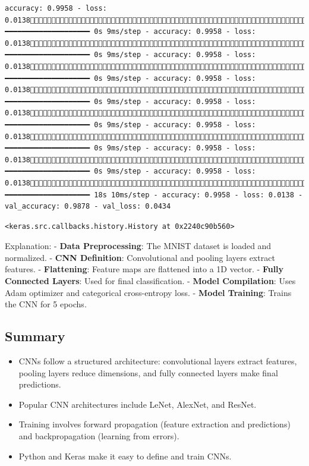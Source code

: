 \documentclass[
  letterpaper,
  DIV=11,
  numbers=noendperiod]{scrreprt}
\providecommand{\tightlist}{%
  \setlength{\itemsep}{0pt}\setlength{\parskip}{0pt}}\usepackage{longtable,booktabs,array}
\begin{document}
\begin{verbatim}
accuracy: 0.9958 - loss: 0.01381832/1875 ━━━━━━━━━━━━━━━━━━━━ 0s 9ms/step - accuracy: 0.9958 - loss: 0.01381838/1875 ━━━━━━━━━━━━━━━━━━━━ 0s 9ms/step - accuracy: 0.9958 - loss: 0.01381844/1875 ━━━━━━━━━━━━━━━━━━━━ 0s 9ms/step - accuracy: 0.9958 - loss: 0.01381850/1875 ━━━━━━━━━━━━━━━━━━━━ 0s 9ms/step - accuracy: 0.9958 - loss: 0.01381857/1875 ━━━━━━━━━━━━━━━━━━━━ 0s 9ms/step - accuracy: 0.9958 - loss: 0.01381864/1875 ━━━━━━━━━━━━━━━━━━━━ 0s 9ms/step - accuracy: 0.9958 - loss: 0.01381871/1875 ━━━━━━━━━━━━━━━━━━━━ 0s 9ms/step - accuracy: 0.9958 - loss: 0.01381875/1875 ━━━━━━━━━━━━━━━━━━━━ 18s 10ms/step - accuracy: 0.9958 - loss: 0.0138 - val_accuracy: 0.9878 - val_loss: 0.0434
\end{verbatim}

\begin{verbatim}
<keras.src.callbacks.history.History at 0x2240c90b560>
\end{verbatim}

Explanation: - \textbf{Data Preprocessing}: The MNIST dataset is loaded
and normalized. - \textbf{CNN Definition}: Convolutional and pooling
layers extract features. - \textbf{Flattening}: Feature maps are
flattened into a 1D vector. - \textbf{Fully Connected Layers}: Used for
final classification. - \textbf{Model Compilation}: Uses Adam optimizer
and categorical cross-entropy loss. - \textbf{Model Training}: Trains
the CNN for 5 epochs.

\subsection{Summary}\label{summary-2}

\begin{itemize}
\tightlist
\item
  CNNs follow a structured architecture: convolutional layers extract
  features, pooling layers reduce dimensions, and fully connected layers
  make final predictions.
\item
  Popular CNN architectures include LeNet, AlexNet, and ResNet.
\item
  Training involves forward propagation (feature extraction and
  predictions) and backpropagation (learning from errors).
\item
  Python and Keras make it easy to define and train CNNs.
\end{itemize}
\end{document}
